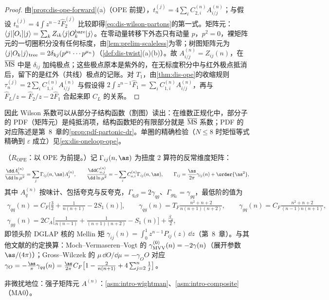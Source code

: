 \begin{proof}
由\cref{prop:dis-ope-forward}(a)（OPE 前提），$t^{(j)}_n=4\sum_iC^{(n)}_{2,i}A^{(n)}_{i/j}$；与假设 $t^{(j)}_n=4\int z^{n-2}\hat F^{(j)}_2$ 比较即得\cref{eq:dis-wilson-partons}的第一式。矩阵元：$\langle j|[O_i]|j\rangle=\sum_kZ_{ik}\langle j|O_k^{\rm bare}|j\rangle$。在零动量转移下外态只有动量 $p$，$p^2=0$，裸矩阵元的一切圈积分没有任何标度，由\cref{lem:prelim-scaleless}为零；树图矩阵元为 $\langle j|O_k|j\rangle_{\rm tree}=2\delta_{kj}(p^{\mu_1}\cdots p^{\mu_n})$（\cref{def:dis-twist}(a)(b)）。故 $A^{(n)}_{i/j}=Z_{ij}(n)$，在 $\overline{\rm MS}$ 中是 $\delta_{ij}$ 加纯极点；这些极点原本是紫外的，在无标度积分中与红外极点抵消后，留下的是红外（共线）极点的记账。对 $T_1$，由\cref{thm:dis-ope}的收缩规则 $\tau^{(j)}_n=2\sum_iC^{(n)}_{1,i}A^{(n)}_{i/j}$ 与假设得 $2\int z^{n-1}\hat F_1=\sum_iC^{(n)}_{1,i}A^{(n)}_{i/j}$，再与 $\hat F_L/z=\hat F_2/z-2\hat F_1$ 合起来即 $C_L$ 的关系。
\end{proof}

因此 Wilson 系数可以从部分子结构函数（割图）读出：在维数正规化中，部分子的 PDF（矩阵元）是纯抵消项，结构函数矩的有限部分就是 $\overline{\rm MS}$ 系数；PDF 的对应陈述是第~8~章的\cref{prop:pdf-partonic-dr}。单圈的精确检验（$N\le8$ 时矩恒等式精确到 $\varepsilon$ 成立）见\cref{ex:dis-oneloop-ope}。

\begin{proposition}\label{prop:dis-ope-rg}
（$R_{\mathrm{OPE}}$：以 OPE 为前提。）记 $\Gamma_{ij}(n,\as)$ 为扭度 2 算符的反常维度矩阵：
\begin{equation}\label{eq:dis-rg}
\frac{\dd A^{(n)}_i}{\dd\ln\mu^2}=\sum_j\Gamma_{ij}(n,\as)A^{(n)}_j,\qquad \frac{\dd C^{(n)}_{a,j}}{\dd\ln\mu^2}=-\sum_iC^{(n)}_{a,i}\Gamma_{ij}(n,\as),\qquad \Gamma_{ij}=\frac{\as}{2\pi}\gamma_{ij}(n)+\order{\as^2},
\end{equation}
其中 $A^{(n)}_q$ 按味计、包括夸克与反夸克，$\Gamma_{q_kg}=2\gamma_{qg}$、$\Gamma_{gq_k}=\gamma_{gq}$，最低阶的值为%
\begin{gather}
\gamma_{qq}(n)=C_F\Big[\frac32+\frac1{n(n+1)}-2S_1(n)\Big],\qquad \gamma_{qg}(n)=T_F\frac{n^2+n+2}{n(n+1)(n+2)},\qquad \gamma_{gq}(n)=C_F\frac{n^2+n+2}{(n-1)n(n+1)},\nonumber\\
\gamma_{gg}(n)=2C_A\Big[\frac1{n(n-1)}+\frac1{(n+1)(n+2)}-S_1(n)\Big]+\frac{\beta_0}2,\label{eq:dis-gamma0}
\end{gather}
即领头阶 DGLAP 核的 Mellin 矩 $\gamma_{ij}(n)=\int_0^1z^{n-1}P_{ij}(z)\,\dd z$（第~8~章）。与其他文献的约定换算：Moch--Vermaseren--Vogt 的 $\gamma^{(0)}_{\rm MVV}(n)=-2\gamma(n)$（展开参数 $\as/(4\pi)$）；Gross--Wilczek 的 $\mu\,\dd O/\dd\mu=-\gamma_OO$ 对应 $\gamma_O=-\frac{\as}\pi\gamma_{qq}(n)=\frac{\as}{2\pi}C_F\big[1-\frac2{n(n+1)}+4\sum_{j=2}^n\frac1j\big]$。
\par
非微扰地位：强子矩阵元 $A^{(n)}$：\cref{asm:intro-wightman}、\cref{asm:intro-composite}（MA0）。
\end{proposition}

